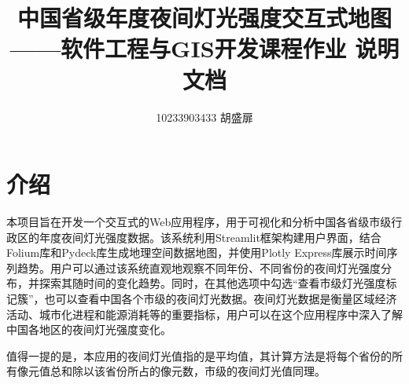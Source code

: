 \documentclass[14pt,a4paper,UTF8,twoside]{article}
\author{10233903433 胡盛扉}
\title{\huge{中国省级年度夜间灯光强度交互式地图} \\ \Large{——软件工程与GIS开发课程作业 \hspace{0.1em} 说明文档}}
\begin{document}
\maketitle

\section{介绍}
本项目旨在开发一个交互式的Web应用程序，用于可视化和分析中国各省级市级行政区的年度夜间灯光强度数据。该系统利用Streamlit框架构建用户界面，结合Folium库和Pydeck库生成地理空间数据地图，并使用Plotly Express库展示时间序列趋势。用户可以通过该系统直观地观察不同年份、不同省份的夜间灯光强度分布，并探索其随时间的变化趋势。同时，在其他选项中勾选“查看市级灯光强度标记簇”，也可以查看中国各个市级的夜间灯光数据。夜间灯光数据是衡量区域经济活动、城市化进程和能源消耗等的重要指标，用户可以在这个应用程序中深入了解中国各地区的夜间灯光强度变化。

值得一提的是，本应用的夜间灯光值指的是平均值，其计算方法是将每个省份的所有像元值总和除以该省份所占的像元数，市级的夜间灯光值同理。
\end{document}
